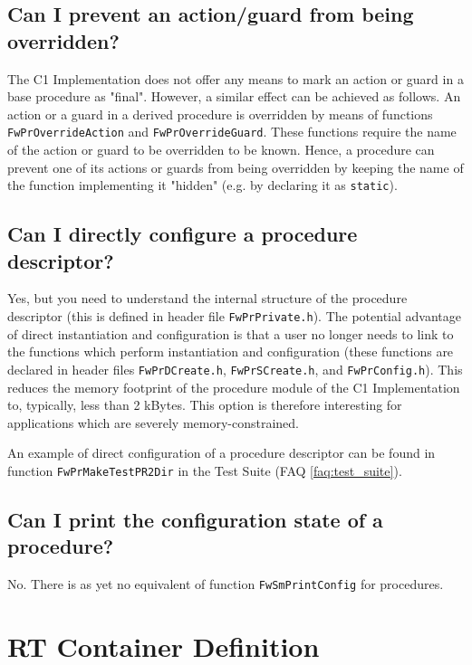 \documentclass[a4paper,10pt]{article}
\let\stdsection\section
\renewcommand\section{\newpage\stdsection}
\begin{document}
\subsection{Can I prevent an action/guard from being overridden?}
The C1 Implementation does not offer any means to mark an action or guard in a base procedure as "final". However, a similar effect can be achieved 
as follows. An action or a guard in a derived procedure is overridden by means of functions \texttt{FwPrOverrideAction} and \texttt{FwPrOverrideGuard}. 
These functions require the name of the action or guard to be overridden to be known. Hence, a procedure can prevent one of its actions or guards 
from being overridden by keeping the name of the function implementing it "hidden" (e.g. by declaring it as \texttt{static}).

\subsection{Can I directly configure a procedure descriptor?}
Yes, but you need to understand the internal structure of the procedure descriptor (this is defined in header file \texttt{FwPrPrivate.h}). 
The potential advantage of direct instantiation and configuration is that a user no longer needs to link to the functions which perform instantiation 
and configuration (these functions are declared in header files \texttt{FwPrDCreate.h}, \texttt{FwPrSCreate.h}, and \texttt{FwPrConfig.h}). This reduces 
the memory footprint of the procedure module of the C1 Implementation to, typically, less than 2 kBytes. This option is therefore interesting for 
applications which are severely memory-constrained.

An example of direct configuration of a procedure descriptor can be found in function \texttt{FwPrMakeTestPR2Dir} in the Test Suite (FAQ \ref{faq:test_suite}).

\subsection{Can I print the configuration state of a procedure?}
No. There is as yet no equivalent of function \texttt{FwSmPrintConfig} for procedures.


\section{RT Container Definition}
\end{document}
